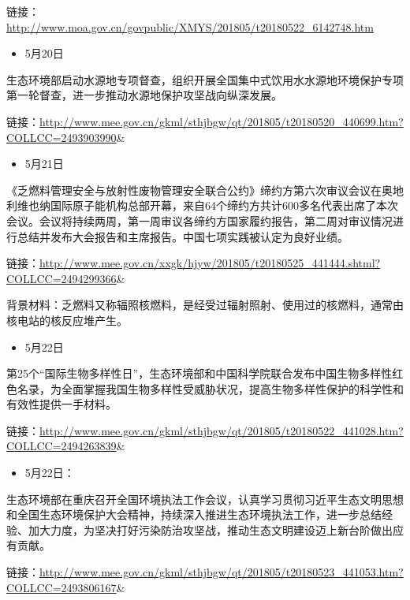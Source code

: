 \documentclass[]{book}
\providecommand{\tightlist}{%
  \setlength{\itemsep}{0pt}\setlength{\parskip}{0pt}}
\begin{document}
链接：\url{http://www.moa.gov.cn/govpublic/XMYS/201805/t20180522_6142748.htm}

\begin{itemize}
\tightlist
\item
  5月20日
\end{itemize}

生态环境部启动水源地专项督查，组织开展全国集中式饮用水水源地环境保护专项第一轮督查，进一步推动水源地保护攻坚战向纵深发展。

链接：\url{http://www.mee.gov.cn/gkml/sthjbgw/qt/201805/t20180520_440699.htm?COLLCC=2493903990}\&

\begin{itemize}
\tightlist
\item
  5月21日
\end{itemize}

《乏燃料管理安全与放射性废物管理安全联合公约》缔约方第六次审议会议在奥地利维也纳国际原子能机构总部开幕，来自64个缔约方共计600多名代表出席了本次会议。会议将持续两周，第一周审议各缔约方国家履约报告，第二周对审议情况进行总结并发布大会报告和主席报告。中国七项实践被认定为良好业绩。

链接：\url{http://www.mee.gov.cn/xxgk/hjyw/201805/t20180525_441444.shtml?COLLCC=2494299366}\&

背景材料：乏燃料又称辐照核燃料，是经受过辐射照射、使用过的核燃料，通常由核电站的核反应堆产生。

\begin{itemize}
\tightlist
\item
  5月22日
\end{itemize}

第25个``国际生物多样性日''，生态环境部和中国科学院联合发布中国生物多样性红色名录，为全面掌握我国生物多样性受威胁状况，提高生物多样性保护的科学性和有效性提供一手材料。

链接：\url{http://www.mee.gov.cn/gkml/sthjbgw/qt/201805/t20180522_441028.htm?COLLCC=2494263839}\&

\begin{itemize}
\tightlist
\item
  5月22日：
\end{itemize}

生态环境部在重庆召开全国环境执法工作会议，认真学习贯彻习近平生态文明思想和全国生态环境保护大会精神，持续深入推进生态环境执法工作，进一步总结经验、加大力度，为坚决打好污染防治攻坚战，推动生态文明建设迈上新台阶做出应有贡献。

链接：\url{http://www.mee.gov.cn/gkml/sthjbgw/qt/201805/t20180523_441053.htm?COLLCC=2493806167}\&
\end{document}
